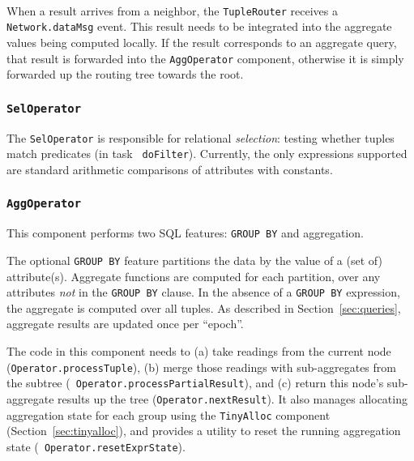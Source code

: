 \documentclass[11pt]{article}
\begin{document}
\vspace{1em}
\\
  When a result arrives from a neighbor, the {\tt TupleRouter} receives a {\tt Network.dataMsg} event.
  This result needs to be integrated into the aggregate values being computed
  locally.  If the result corresponds to an aggregate query, that result
  is forwarded into the {\tt AggOperator} component, otherwise it is 
  simply forwarded up the routing tree towards the root.

\subsubsection {\tt SelOperator}
The {\tt SelOperator} is responsible for relational {\em
selection}: testing whether tuples match predicates (in task {\tt
doFilter}). Currently, the only expressions supported are standard
arithmetic comparisons of attributes with constants.

\subsubsection {\tt AggOperator}
This component performs two SQL features: {\tt GROUP BY} and
aggregation.

The optional {\tt GROUP BY} feature partitions the data by the value
of a (set of) attribute(s).  Aggregate functions are computed for each
partition, over any attributes {\em not} in the {\tt GROUP BY} clause.  In
the absence of a {\tt GROUP BY} expression, the aggregate is computed
over all tuples.  As described in Section~\ref{sec:queries}, aggregate
results are updated once per ``epoch''.

The code in this component needs to (a) take readings from the current
node ({\tt Operator.processTuple}), (b) merge those readings
with sub-aggregates from the subtree ({\tt
Operator.processPartialResult}), and (c) return this node's
sub-aggregate results up the tree ({\tt Operator.nextResult}).
It also manages allocating aggregation state for each group using the
{\tt TinyAlloc} component (Section~\ref{sec:tinyalloc}), and
provides a utility to reset the running aggregation state ({\tt
Operator.resetExprState}).
\end{document}
